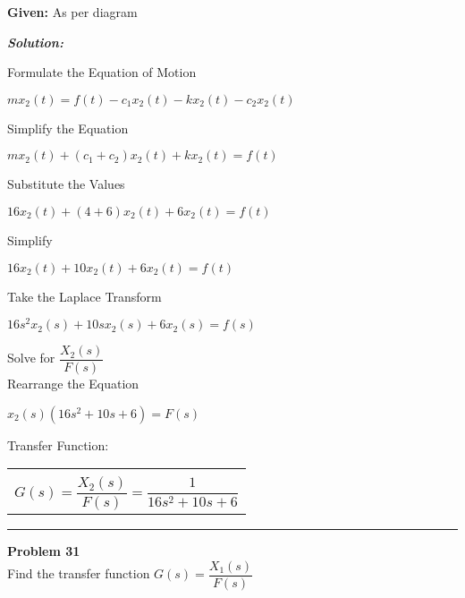 \documentclass[11pt,letterpaper]{article}
\begin{document}
\noindent\textbf{Given:} As per diagram

\vspace{12pt}
\noindent\textit{\textbf{Solution:}}

\vspace{12pt}

Formulate the Equation of Motion\\
\begin{center}
	$mx_2(t)=f(t)-c_1x_2(t)-kx_2(t)-c_2x_2(t)$\\
\end{center}
Simplify the Equation\\
\begin{center}
	$mx_2(t)+(c_1+c_2)x_2(t)+kx_2(t)=f(t)$\\
\end{center}
Substitute the Values\\
\begin{center}
	$16x_2(t)+(4+6)x_2(t)+6x_2(t)=f(t)$\\
\end{center}
Simplify\\
\begin{center}
	$16x_2(t)+10x_2(t)+6x_2(t)=f(t)$\\
\end{center}
Take the Laplace Transform\\
\begin{center}
	$16s^2x_2(s)+10sx_2(s)+6x_2(s)=f(s)$\\
\end{center}
Solve for $\dfrac{X_2(s)}{F(s)}$\\[12pt]
Rearrange the Equation\\
\begin{center}
	$x_2(s)(16s^2+10s+6)=F(s)$\\
\end{center}
Transfer Function:\\
\begin{center}
	\begin{tabular}{|c|}
		\hline \\
		$G(s)=\dfrac{X_2(s)}{F(s)}=\dfrac{1}{16s^2+10s+6}$	\\ [12pt]
	\hline
	\end{tabular}	
\end{center}

\clearpage

\rule{\textwidth}{1pt}
\textbf{Problem 31}\\
Find the transfer function $G(s)=\dfrac{X_1(s)}{F(s)}$\\
\end{document}
